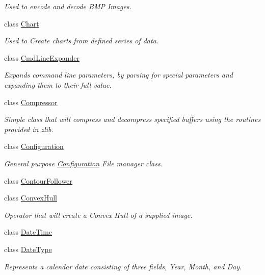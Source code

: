 \begin{DoxyCompactItemize}
\begin{DoxyCompactList}\small\item\em Used to encode and decode B\+MP Images. \end{DoxyCompactList}\item 
class \hyperlink{class_k_k_b_1_1_chart}{Chart}
\begin{DoxyCompactList}\small\item\em Used to Create chart\textquotesingle{}s from defined series of data. \end{DoxyCompactList}\item 
class \hyperlink{class_k_k_b_1_1_cmd_line_expander}{Cmd\+Line\+Expander}
\begin{DoxyCompactList}\small\item\em Expands command line parameters, by parsing for special parameters and expanding them to their full value. \end{DoxyCompactList}\item 
class \hyperlink{class_k_k_b_1_1_compressor}{Compressor}
\begin{DoxyCompactList}\small\item\em Simple class that will compress and decompress specified buffers using the routines provided in zlib. \end{DoxyCompactList}\item 
class \hyperlink{class_k_k_b_1_1_configuration}{Configuration}
\begin{DoxyCompactList}\small\item\em General purpose \hyperlink{class_k_k_b_1_1_configuration}{Configuration} File manager class. \end{DoxyCompactList}\item 
class \hyperlink{class_k_k_b_1_1_contour_follower}{Contour\+Follower}
\item 
class \hyperlink{class_k_k_b_1_1_convex_hull}{Convex\+Hull}
\begin{DoxyCompactList}\small\item\em Operator that will create a Convex Hull of a supplied image. \end{DoxyCompactList}\item 
class \hyperlink{class_k_k_b_1_1_date_time}{Date\+Time}
\item 
class \hyperlink{class_k_k_b_1_1_date_type}{Date\+Type}
\begin{DoxyCompactList}\small\item\em Represents a calendar date consisting of three fields, Year, Month, and Day. \end{DoxyCompactList}\item 

\end{DoxyCompactItemize}
